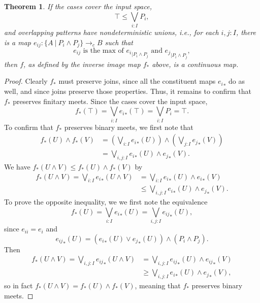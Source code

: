 \documentclass[conference]{IEEEtran}
\newtheorem{theorem}{Theorem}
\newcommand{\cto}{\to_c}
\newcommand{\suchthat}{\ |\ }
\newcommand{\restrict}[2]{{#1}_{|{#2}}}
\newcommand{\isthemaxof}[3]{{#1}\text{ is the max of }{#2}\text{ and }{#3}}
\begin{document}
\begin{theorem}
\label{pattern}
If the cases cover the input space,
\[
\top \le \bigvee_{i : I} P_i \tag{covering},
\]
and overlapping patterns have nondeterministic unions, i.e., for each $i, j : I$, there is a map $e_{ij} : \{A \suchthat P_i \wedge P_j \} \cto B$ such that
\[
\isthemaxof{ e_{ij} }{ \restrict{e_i}{P_i \wedge P_j} }{ \restrict{e_j}{P_i \wedge P_j } }, \tag{gluing}
\]
then $f$, as defined by the inverse image map $f_*$ above, is a continuous map.
\end{theorem}
\begin{proof}
Clearly $f_*$ must preserve joins, since all the constituent maps ${e_i}_*$ do as well, and since joins preserve those properties. Thus, it remains to confirm that $f_*$ preserves finitary meets.
Since the cases cover the input space,
\[
f_*(\top) = \bigvee_{i : I} {e_i}_*(\top) = \bigvee_{i : I}P_i = \top.
\]
To confirm that $f_*$ preserves binary meets, we first note that
\begin{align*}
f_*(U) \wedge f_*(V) 
  &= \left(\bigvee_{i : I} {e_i}_*(U) \right) \wedge \left( \bigvee_{j: I} {e_j}_*(V) \right)
\\ &= \bigvee_{i, j : I} {e_i}_*(U) \wedge {e_j}_*(V).
\end{align*}
We have $f_*(U \wedge V) \le f_*(U) \wedge f_*(V)$ by
\begin{align*}
f_*(U \wedge V)
  = \bigvee_{i : I} {e_i}_*(U \wedge V)
  &= \bigvee_{i : I} {e_i}_*(U) \wedge {e_i}_*(V)
  \\ &\le \bigvee_{i, j : I} {e_i}_*(U) \wedge {e_j}_*(V).
\end{align*}
To prove the opposite inequality, we we first note the equivalence
\[
f_*(U) = \bigvee_{i : I} {e_i}_*(U) = \bigvee_{i, j : I} {e_{ij}}_*(U),
\]
since $e_{ii} = e_i$ and 
\[
{e_{ij}}_*(U) = \left( {e_i}_*(U) \vee {e_j}_*(U) \right) \wedge \left(P_i \wedge P_j \right).
\]
Then
\begin{align*}
f_*(U \wedge V)
  = \bigvee_{i, j : I} {e_{ij}}_*(U \wedge V)
  &= \bigvee_{i, j : I} {e_{ij}}_*(U) \wedge {e_{ij}}_*(V)
  \\ &\ge \bigvee_{i, j : I} {e_i}_*(U) \wedge {e_j}_*(V),
\end{align*}
so in fact $f_*(U \wedge V) = f_*(U) \wedge f_*(V)$, meaning that $f_*$ preserves binary meets.
\end{proof}
\end{document}
